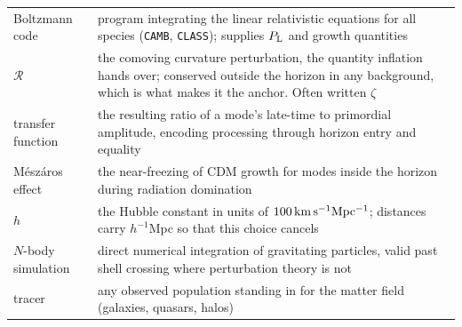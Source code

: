 \documentclass[a4paper,11pt]{article}
\def\Plin{P_{\rm L}}
\numberwithin{equation}{section}
\begin{document}
\begin{center}
\small
\begin{tabular}{@{}p{}p{}@{}}
\toprule
Boltzmann code & program integrating the linear relativistic equations for all species (\texttt{CAMB}, \texttt{CLASS}); supplies $\Plin$ and growth quantities \\
$\mathcal{R}$ & the comoving curvature perturbation, the quantity inflation
hands over; conserved outside the horizon in any background, which is what makes
it the anchor. Often written $\zeta$ \\
transfer function & the resulting ratio of a mode's late-time to primordial amplitude, encoding processing through horizon entry and equality \\
M\'esz\'aros effect & the near-freezing of CDM growth for modes inside the horizon during radiation domination \\
$h$ & the Hubble constant in units of $100\,{\rm km\,s^{-1}Mpc^{-1}}$; distances carry $h^{-1}$Mpc so that this choice cancels \\
$N$-body simulation & direct numerical integration of gravitating particles, valid past shell crossing where perturbation theory is not \\
tracer & any observed population standing in for the matter field (galaxies, quasars, halos) \\
\bottomrule
\end{tabular}
\end{center}
\end{document}
